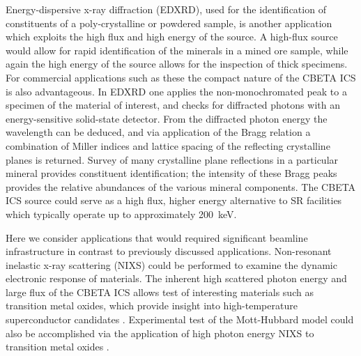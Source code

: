 \documentclass[../main.tex]{subfiles}
\begin{document}
Energy-dispersive x-ray diffraction (EDXRD), used for the identification of constituents of a poly-crystalline or powdered sample, is another application which exploits the high flux and high energy of the source. A high-flux source would allow for rapid identification of the minerals in a mined ore sample, while again the high energy of the source allows for the inspection of thick specimens. For commercial applications such as these the compact nature of the CBETA ICS is also advantageous. In EDXRD \cite{kampfe2005energy} one applies the non-monochromated peak to a specimen of the material of interest, and checks for diffracted photons with an energy-sensitive solid-state detector. From the diffracted photon energy the wavelength can be deduced, and via application of the Bragg relation a combination of Miller indices and lattice spacing of the reflecting crystalline planes is returned. Survey of many crystalline plane reflections in a particular mineral provides constituent identification; the intensity of these Bragg peaks provides the relative abundances of the various mineral components. The CBETA ICS source could serve as a high flux, higher energy alternative to SR facilities \cite{CHESSstructuralmaterialsbeamline} which typically operate up to approximately 200~\si{\kilo\electronvolt}. 

Here we consider applications that would required significant beamline infrastructure in contrast to  previously discussed applications. Non-resonant inelastic x-ray scattering (NIXS) \cite{isaacs1996inelastic} could be performed to examine the dynamic electronic response of materials. The inherent high scattered photon energy and large flux  of the CBETA ICS allows test of interesting materials such as transition metal oxides, which provide insight into high-temperature superconductor candidates \cite{hasan2002momentum,isaacs1996inelastic}. Experimental test of the Mott-Hubbard model \cite{hubbard1963electron,mott1949basis} could also be accomplished via the application of high photon energy NIXS to transition metal oxides \cite{isaacs1996resonant}.
\end{document}
